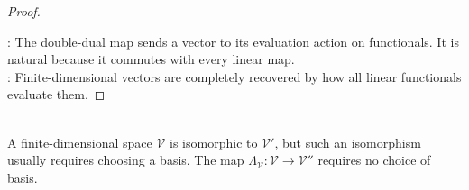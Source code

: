 \begin{theorem}
\begin{proof}
\begin{enumerate}[label=(\roman*)]
\end{enumerate}
: The double-dual map sends a vector to its evaluation action on functionals. It is natural because it commutes with every linear map.\\
: Finite-dimensional vectors are completely recovered by how all linear functionals evaluate them.
\end{proof}
\end{theorem}

\begin{perspective} \\
A finite-dimensional space $\mathcal{V}$ is isomorphic to $\mathcal{V}'$, but such an isomorphism usually requires choosing a basis. The map $\Lambda_{\mathcal{V}}:\mathcal{V}\to\mathcal{V}''$ requires no choice of basis.
\end{perspective}
